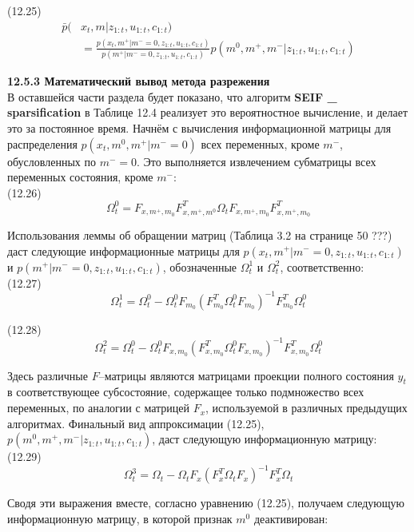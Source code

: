 \documentclass[10pt,a4paper]{article}
\begin{document}
(12.25)
\begin{equation*}
\begin{split}
\bar{p}(&x_t,m|z_{1:t},u_{1:t},c_{1:t})\\
&=\frac{p(x_t,m^+|m^-=0,z_{1:t},u_{1:t},c_{1:t})}{p(m^+|m^-=0,z_{1:t},u_{1:t},c_{1:t})}p(m^0,m^+,m^-|z_{1:t},u_{1:t},c_{1:t})
\end{split}
\end{equation*}

\textbf{12.5.3	Математический вывод метода разрежения}\\

В оставшейся части раздела будет показано, что алгоритм \textbf{SEIF \_ sparsification} в Таблице 12.4 реализует это вероятностное вычисление, и делает это за постоянное время. Начнём с вычисления информационной матрицы для распределения $p(x_t, m^0, m^+ | m^- = 0)$ всех переменных, кроме $m^-$, обусловленных по $m^- = 0$. Это выполняется извлечением субматрицы всех переменных состояния, кроме $m^-$:\\

(12.26)
$$\varOmega_t^0=F_{x,m^+,m_0}F_{x,m^+,m^0}^T\varOmega_tF_{x,m^+,m_0}F_{x,m^+,m_0}^T$$

Использования леммы об обращении матриц (Таблица 3.2 на странице 50 ???) даст следующие информационные матрицы для $p(x_t,m^+|m^-=0,z_{1:t},u_{1:t},c_{1:t})$ и $p(m^+|m^-=0,z_{1:t},u_{1:t},c_{1:t})$, обозначенные $\varOmega_t^1$ и $\varOmega_t^2$, соответственно:\\

(12.27)
$$\varOmega_t^1=\varOmega_t^0-\varOmega_t^0F_{m_0}(F_{m_0}^T\varOmega_t^0F_{m_0})^{-1}F_{m_0}^T\varOmega_t^0$$

(12.28)
$$\varOmega_t^2=\varOmega_t^0-\varOmega_t^0F_{x,m_0}(F_{x,m_0}^T\varOmega_t^0F_{x,m_0})^{-1}F_{x,m_0}^T\varOmega_t^0$$

Здесь различные $F$–матрицы являются матрицами проекции полного состояния $y_t$ в соответствующее субсостояние, содержащее только подмножество всех переменных, по аналогии с матрицей $F_x$, используемой в различных предыдущих алгоритмах. Финальный вид аппроксимации (12.25), $p(m^0, m^+, m^-|z_{1:t}, u_{1:t}, c_{1:t})$, даст следующую информационную матрицу:\\

(12.29)
$$\varOmega_t^3=\varOmega_t-\varOmega_tF_x(F_x^T\varOmega_tF_x)^{-1}F_x^T\varOmega_t$$

Сводя эти выражения вместе, согласно уравнению (12.25), получаем следующую информационную матрицу, в которой признак $m^0$ деактивирован:\\
\end{document}
